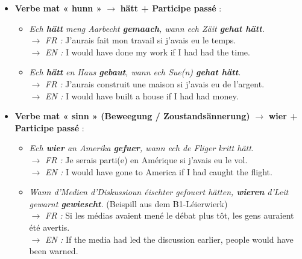\begin{itemize}
    \item \textbf{Verbe mat « hunn »} $\rightarrow$ \textbf{hätt + Participe passé} :
    \begin{itemize}
        \item \textit{Ech \textbf{hätt} meng Aarbecht \textbf{gemaach}, wann ech Zäit \textbf{gehat hätt}.} \\
        $\rightarrow$ \textit{FR :} J'aurais fait mon travail si j'avais eu le temps. \\
        $\rightarrow$ \textit{EN :} I would have done my work if I had had the time.
        \item \textit{Ech \textbf{hätt} en Haus \textbf{gebaut}, wann ech Sue(n) \textbf{gehat hätt}.} \\
        $\rightarrow$ \textit{FR :} J'aurais construit une maison si j'avais eu de l'argent. \\
        $\rightarrow$ \textit{EN :} I would have built a house if I had had money.
    \end{itemize}

    \vspace{0.4em}

    \item \textbf{Verbe mat « sinn » (Beweegung / Zoustandsännerung)} $\rightarrow$ \textbf{wier + Participe passé} :
    \begin{itemize}
        \item \textit{Ech \textbf{wier} an Amerika \textbf{gefuer}, wann ech de Fliger kritt hätt.} \\
        $\rightarrow$ \textit{FR :} Je serais parti(e) en Amérique si j'avais eu le vol. \\
        $\rightarrow$ \textit{EN :} I would have gone to America if I had caught the flight.
        \item \textit{Wann d'Medien d'Diskussioun éischter gefouert hätten, \textbf{wieren} d'Leit gewarnt \textbf{gewiescht}.} (Beispill aus dem B1-Léierwierk) \\
        $\rightarrow$ \textit{FR :} Si les médias avaient mené le débat plus tôt, les gens auraient été avertis. \\
        $\rightarrow$ \textit{EN :} If the media had led the discussion earlier, people would have been warned.
    \end{itemize}
\end{itemize}

\vspace{0.8em}

